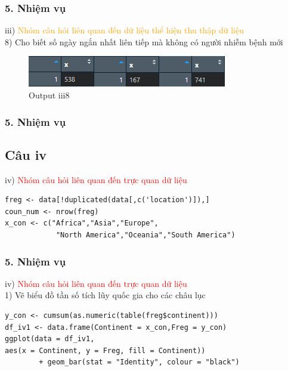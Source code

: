 \documentclass[english,10pt,table]{beamer}
\begin{document}
\begin{frame}[fragile]
\frametitle{5.  Nhiệm vụ}
	iii) \textcolor{orange}{Nhóm câu hỏi liên quan đến dữ liệu thể hiện thu thập dữ liệu}\\%
    8) Cho biết số ngày ngắn nhất liên tiếp mà không có người nhiễm bệnh mới
	\begin{figure}[h!]
	\begin{center}
		    \includegraphics[scale = 1]{Images/III/iii8.png}
		     \caption{Output iii8}
		\end{center}
		\end{figure}
\end{frame}

\begin{frame}[fragile]
\frametitle{5.  Nhiệm vụ}
\subsection{Câu iv}
iv) \textcolor{red}{Nhóm câu hỏi liên quan đến trực quan dữ liệu}
    \lstset{
    title=Prep for iv1-2}
    \begin{lstlisting}[frame=single]  
freg <- data[!duplicated(data[,c('location')]),]
coun_num <- nrow(freg)
x_con <- c("Africa","Asia","Europe",
            "North America","Oceania","South America")
\end{lstlisting}
\end{frame}
\begin{frame}[fragile]
\frametitle{5.  Nhiệm vụ}
iv) \textcolor{red}{Nhóm câu hỏi liên quan đến trực quan dữ liệu}\\
   1) Vẽ biểu đồ tần số tích lũy quốc gia cho các châu lục
\begin{lstlisting}[frame=single]  
y_con <- cumsum(as.numeric(table(freg$continent)))
df_iv1 <- data.frame(Continent = x_con,Freg = y_con)
ggplot(data = df_iv1, 
aes(x = Continent, y = Freg, fill = Continent)) 
        + geom_bar(stat = "Identity", colour = "black")
\end{lstlisting}
\end{frame}
\end{document}
